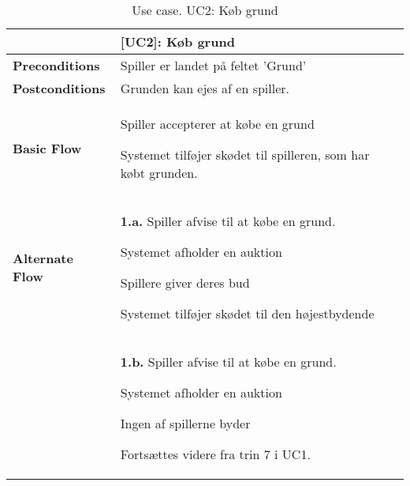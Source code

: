 \documentclass[class=article, crop=false]{standalone}
\begin{document}
        \begin{table}[H]
            \caption{Use case. UC2: Køb grund}
            \begin{tabularx}{\textwidth}{|l|X|}
                \hline
                & \textbf{[UC2]: Køb grund}   \\ \hline
                \textbf{Preconditions}       & Spiller er landet på feltet 'Grund'\\ \hline
                \textbf{Postconditions}      & Grunden kan ejes af en spiller.\\ \hline


                \textbf{Basic Flow} & \begin{tabenum}
                                          \item Spiller accepterer at købe en grund
                                          \item Systemet tilføjer skødet til spilleren, som har købt grunden.
                \end{tabenum}   \\ \hline




                \textbf{Alternate Flow}   & \textbf{1.a.} Spiller afvise til at købe en grund.
                \begin{enumerate} \begin{tabenum}
                                      \item Systemet afholder en auktion
                                      \item Spillere giver deres bud
                                      \item Systemet tilføjer skødet til den højestbydende
                \end{tabenum} \end{enumerate}
                \\


                                            & \textbf{1.b.} Spiller afvise til at købe en grund.
                \begin{enumerate} \begin{tabenum}
                                      \item Systemet afholder en auktion
                                      \item Ingen af spillerne byder
                                      \item Fortsættes videre fra trin 7 i UC1.
                \end{tabenum} \end{enumerate}
                \\



                \hline

            \end{tabularx}


        \end{table}

    
\end{document}
